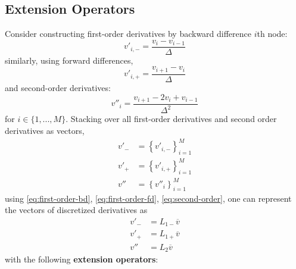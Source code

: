 \documentclass[11pt]{article}
\newcommand{\set}[1]{\ensuremath{\left\{{#1}\right\}}}
\theoremstyle{definition}
\begin{document}
\subsection{Extension Operators}
Consider constructing first-order derivatives by backward difference $i$th node:
\begin{equation}\label{eq:first-order-bd}
v'_{i,-} = \dfrac{v_{i} - v_{i-1}}{\Delta}
\end{equation}
similarly, using forward differences,
\begin{equation}\label{eq:first-order-fd}
v'_{i,+} = \dfrac{v_{i+1} - v_{i}}{\Delta}
\end{equation}
and second-order derivatives:
\begin{equation}\label{eq:second-order}
v''_{i} = \dfrac{v_{i+1} - 2 v_{i} + v_{i-1} }{\Delta^2}
\end{equation}
for $i \in \{1, ..., M\}$. Stacking over all first-order derivatives and second order derivatives as vectors, 
\begin{align}
v'_{-} &= \set{v'_{i,-}}_{i=1}^M \\
v'_{+} &= \set{v'_{i,+}}_{i=1}^M \\
v'' &= \set{v''_{i}}_{i=1}^M
\end{align}
using \eqref{eq:first-order-bd}, \eqref{eq:first-order-fd}, \eqref{eq:second-order}, one can represent the vectors of discretized derivatives as
\begin{align}
v'_{-} &= L_{1-} \overline{v} \\
v'_{+} &= L_{1+} \overline{v} \\
v'' &=  L_{2} \overline{v}
\end{align}
with the following \textbf{extension operators}:
\end{document}
